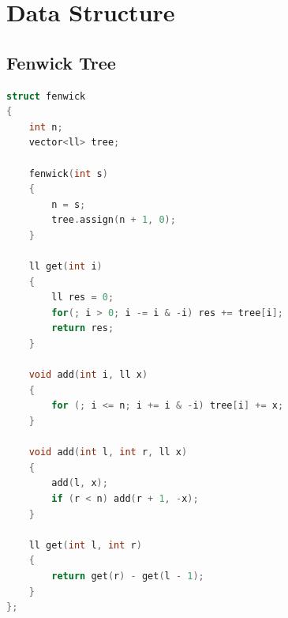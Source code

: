 \chapter{Data Structure}

\section{Fenwick Tree}
\begin{lstlisting}[language=C++]
struct fenwick
{
    int n;
    vector<ll> tree;

    fenwick(int s)
    {
        n = s;
        tree.assign(n + 1, 0);
    }

    ll get(int i)
    {
        ll res = 0;
        for(; i > 0; i -= i & -i) res += tree[i];
        return res;
    }

    void add(int i, ll x)
    {
        for (; i <= n; i += i & -i) tree[i] += x;
    }
    
    void add(int l, int r, ll x)
    {
        add(l, x);
        if (r < n) add(r + 1, -x);
    }
    
    ll get(int l, int r)
    {
        return get(r) - get(l - 1);
    }
};
\end{lstlisting}
\sectionend

